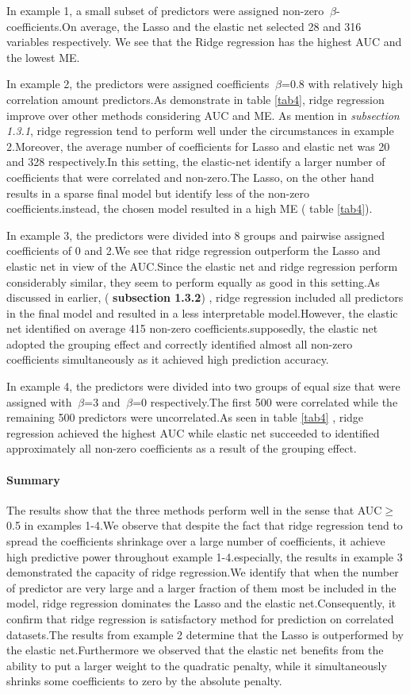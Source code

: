 \documentclass[12pt]{report}
\begin{document}
In example 1, a small subset of predictors were assigned non-zero $\ \beta$-coefficients.On average, the Lasso and the elastic net  selected 28 and 316 variables respectively. We  see that the Ridge regression has the highest AUC and the lowest ME.

In example 2, the predictors were assigned coefficients $\ \beta$=0.8 with relatively high correlation amount predictors.As demonstrate in table \ref{tab4}, ridge regression improve over other methods considering AUC and ME. As mention in \textit{subsection 1.3.1}, ridge regression tend to perform well under the circumstances in example 2.Moreover, the average number of coefficients for Lasso and elastic net was 20 and 328 respectively.In this setting, the elastic-net identify a larger number of coefficients that were correlated and non-zero.The Lasso, on the other hand results in a sparse final model but identify less of the non-zero coefficients.instead, the chosen model resulted in a high ME ( table \ref{tab4}).

In example 3, the predictors were divided into 8 groups and pairwise assigned coefficients of 0 and 2.We see that ridge regression outperform the Lasso and elastic net in view of the AUC.Since the elastic net and ridge regression perform considerably similar, they seem to perform equally as good in this setting.As discussed in earlier, ( \textbf{subsection 1.3.2}) , ridge regression included all predictors in the final model and resulted in a less interpretable model.However, the elastic net identified on average 415 non-zero coefficients.supposedly, the elastic net adopted the grouping effect and correctly identified almost all non-zero coefficients simultaneously as it achieved high prediction accuracy.

In example 4, the predictors were divided into two groups of equal size that were assigned with $\ \beta$=3 and $\ \beta$=0 respectively.The first 500 were correlated while the remaining 500 predictors were uncorrelated.As seen in table \ref{tab4} , ridge regression achieved the highest AUC  while elastic net succeeded to identified approximately all non-zero coefficients as a result of the grouping effect.
\paragraph{Summary}
The results show that the three methods perform well in the sense that AUC$\geq$0.5 in examples 1-4.We observe that despite the fact that ridge regression tend to spread the coefficients shrinkage over a large number of coefficients, it achieve high predictive power throughout example 1-4.especially, the results in example 3 demonstrated the capacity of ridge regression.We identify that when the number of predictor are very large and a larger fraction of them most be included in the model, ridge regression dominates the Lasso and the elastic net.Consequently, it confirm that ridge regression is satisfactory method for prediction on correlated datasets.The results from example 2 determine that the Lasso is outperformed by the elastic net.Furthermore we observed that the elastic net benefits from the ability to put a larger weight to the quadratic penalty, while it simultaneously shrinks some coefficients to zero by the absolute penalty.
\end{document}

